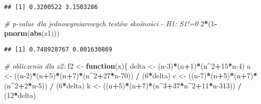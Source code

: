 \documentclass[polish,]{book}
\newenvironment{Shaded}{\begin{snugshade}}{\end{snugshade}}
\newcommand{\CommentTok}[1]{\textcolor[rgb]{0.56,0.35,0.01}{\textit{#1}}}
\newcommand{\ControlFlowTok}[1]{\textcolor[rgb]{0.13,0.29,0.53}{\textbf{#1}}}
\newcommand{\DecValTok}[1]{\textcolor[rgb]{0.00,0.00,0.81}{#1}}
\newcommand{\KeywordTok}[1]{\textcolor[rgb]{0.13,0.29,0.53}{\textbf{#1}}}
\newcommand{\NormalTok}[1]{#1}
\newcommand{\OperatorTok}[1]{\textcolor[rgb]{0.81,0.36,0.00}{\textbf{#1}}}
\newcommand{\StringTok}[1]{\textcolor[rgb]{0.31,0.60,0.02}{#1}}
\begin{document}
\begin{verbatim}
## [1] 0.3200522 3.1503286
\end{verbatim}

\begin{Shaded}
\begin{Highlighting}[]
\CommentTok{# p-value dla jednowymiarowych testów skośności - H1: S1!=0}
\DecValTok{2}\OperatorTok{*}\NormalTok{(}\DecValTok{1}\OperatorTok{-}\KeywordTok{pnorm}\NormalTok{(}\KeywordTok{abs}\NormalTok{(z1)))}
\end{Highlighting}
\end{Shaded}

\begin{verbatim}
## [1] 0.748928767 0.001630869
\end{verbatim}

\begin{Shaded}
\begin{Highlighting}[]
\CommentTok{# obliczenia dla z2:}
\NormalTok{f2 <-}\StringTok{ }\ControlFlowTok{function}\NormalTok{(x)\{}
\NormalTok{  delta <-}\StringTok{ }\NormalTok{(n}\DecValTok{-3}\NormalTok{)}\OperatorTok{*}\NormalTok{(n}\OperatorTok{+}\DecValTok{1}\NormalTok{)}\OperatorTok{*}\NormalTok{(n}\OperatorTok{^}\DecValTok{2}\OperatorTok{+}\DecValTok{15}\OperatorTok{*}\NormalTok{n}\DecValTok{-4}\NormalTok{)}
\NormalTok{  a <-}\StringTok{ }\NormalTok{((n}\DecValTok{-2}\NormalTok{)}\OperatorTok{*}\NormalTok{(n}\OperatorTok{+}\DecValTok{5}\NormalTok{)}\OperatorTok{*}\NormalTok{(n}\OperatorTok{+}\DecValTok{7}\NormalTok{)}\OperatorTok{*}\NormalTok{(n}\OperatorTok{^}\DecValTok{2}\OperatorTok{+}\DecValTok{27}\OperatorTok{*}\NormalTok{n}\DecValTok{-70}\NormalTok{)) }\OperatorTok{/}\StringTok{ }\NormalTok{(}\DecValTok{6}\OperatorTok{*}\NormalTok{delta)}
\NormalTok{  c <-}\StringTok{ }\NormalTok{((n}\DecValTok{-7}\NormalTok{)}\OperatorTok{*}\NormalTok{(n}\OperatorTok{+}\DecValTok{5}\NormalTok{)}\OperatorTok{*}\NormalTok{(n}\OperatorTok{+}\DecValTok{7}\NormalTok{)}\OperatorTok{*}\NormalTok{(n}\OperatorTok{^}\DecValTok{2}\OperatorTok{+}\DecValTok{2}\OperatorTok{*}\NormalTok{n}\DecValTok{-5}\NormalTok{)) }\OperatorTok{/}\StringTok{ }\NormalTok{(}\DecValTok{6}\OperatorTok{*}\NormalTok{delta)}
\NormalTok{  k <-}\StringTok{ }\NormalTok{((n}\OperatorTok{+}\DecValTok{5}\NormalTok{)}\OperatorTok{*}\NormalTok{(n}\OperatorTok{+}\DecValTok{7}\NormalTok{)}\OperatorTok{*}\NormalTok{(n}\OperatorTok{^}\DecValTok{3}\OperatorTok{+}\DecValTok{37}\OperatorTok{*}\NormalTok{n}\OperatorTok{^}\DecValTok{2}\OperatorTok{+}\DecValTok{11}\OperatorTok{*}\NormalTok{n}\DecValTok{-313}\NormalTok{)) }\OperatorTok{/}\StringTok{ }\NormalTok{(}\DecValTok{12}\OperatorTok{*}\NormalTok{delta)}

\end{Highlighting}
\end{Shaded}
\end{document}
